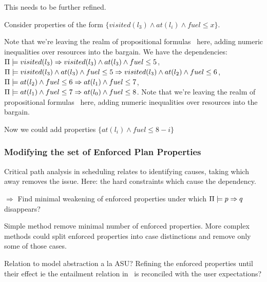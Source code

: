 This needs to be further refined. 

Consider properties of the form $\{visited(l_{3}) \wedge at(l_i)
\wedge fuel \leq x\}$. 


Note that we're leaving the realm of
propositional formulas \candprops\ here, adding numeric inequalities
over resources into the bargain. We have the dependencies:
$\Pi \models visited(l_{3}) \Rightarrow visited(l_{3}) \wedge at(l_{3})
  \wedge fuel \leq 5$, $\Pi \models visited(l_{3}) \wedge
  at(l_{3}) \wedge fuel \leq 5 \Rightarrow visited(l_{3}) \wedge at(l_{2}) \wedge
  fuel \leq 6$, $\Pi \models at(l_{2}) \wedge fuel \leq
  6 \Rightarrow at(l_{1}) \wedge fuel \leq 7$, $\Pi \models at(l_{1})
  \wedge fuel \leq 7 \Rightarrow at(l_{0}) \wedge fuel \leq 8$. Note that we're
leaving the realm of propositional formulas \candprops\ here, adding
numeric inequalities over resources into the bargain.

Now we could add properties $\{at(l_i) \wedge fuel \leq 8-i\}$






  


\subsubsection{Modifying the set of Enforced Plan Properties}
\label{xpp:identify-causes:enforced}

  Critical path analysis in scheduling relates to identifying causes,
  taking which away removes the issue. Here: the hard constraints
  which cause the dependency.

  $\Rightarrow$ Find minimal weakening of enforced properties under
  which $\Pi \models p \Rightarrow q$ disappears?

  Simple method remove minimal number of enforced properties. More
  complex methods could split enforced properties into case
  distinctions and remove only some of those cases.

  Relation to model abstraction a la ASU? Refining the enforced
  properties until their effect ie the entailment relation in
  \plans\ is reconciled with the user expectations?
















